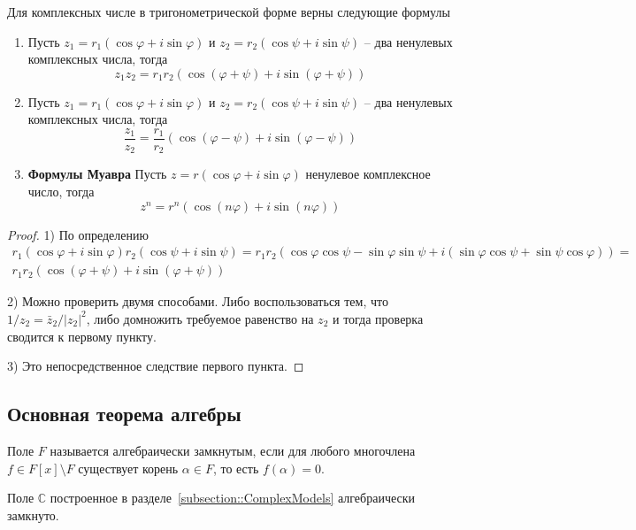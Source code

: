 \begin{claim*}
Для комплексных числе в тригонометрической форме верны следующие формулы
\begin{enumerate}
\item Пусть $z_1 = r_1(\cos \varphi + i \sin \varphi)$ и $z_2=r_2(\cos \psi + i \sin \psi)$ -- два ненулевых комплексных числа, тогда
\[
z_1 z_2 = r_1 r_2 (\cos(\varphi + \psi) + i\sin(\varphi + \psi))
\]

\item Пусть $z_1 = r_1(\cos \varphi + i \sin \varphi)$ и $z_2=r_2(\cos \psi + i \sin \psi)$ -- два ненулевых комплексных числа, тогда
\[
\frac{z_1}{z_2} = \frac{r_1}{r_2}(\cos(\varphi - \psi) + i\sin(\varphi - \psi))
\]

\item {\bf Формулы Муавра}  Пусть $z = r(\cos \varphi + i \sin \varphi)$ ненулевое комплексное число, тогда
\[
z^n = r^n (\cos(n \varphi) + i \sin(n \varphi))
\]

\end{enumerate}
\end{claim*}
\begin{proof}
1) По определению
\begin{gather*}
r_1(\cos \varphi + i \sin \varphi) r_2 (\cos \psi + i \sin \psi) = r_1 r_2 (\cos \varphi \cos \psi - \sin \varphi \sin \psi + i (\sin\varphi \cos \psi + \sin \psi \cos \varphi)) =\\ r_1r_2(\cos(\varphi + \psi) + i\sin (\varphi + \psi))
\end{gather*}

2) Можно проверить двумя способами. Либо воспользоваться тем, что $1/z_2 = \bar z_2 /|z_2|^2$, либо домножить требуемое равенство на $z_2$ и тогда проверка сводится к первому пункту.

3) Это непосредственное следствие первого пункта.
\end{proof}


\subsection{Основная теорема алгебры}

\begin{definition}
Поле $F$ называется алгебраически замкнутым, если для любого многочлена $f\in F[x]\setminus F$ существует корень $\alpha\in F$, то есть $f(\alpha) = 0$.
\end{definition}


\begin{claim}
Поле $\mathbb C$ построенное в разделе~\ref{subsection::ComplexModels} алгебраически замкнуто.
\end{claim}

